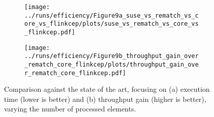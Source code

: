 \begin{figure}[t]
	\begin{subfigure}{.38\linewidth}
		\centering
		\texttt{[image: ../runs/efficiency/Figure9a\_suse\_vs\_rematch\_vs\_core\_vs\_flinkcep/plots/suse\_vs\_rematch\_vs\_core\_vs\_flinkcep.pdf]}
		\vspace{-18pt}
		\caption{}
		\label{plot:suse-vs-rematch-exec-time}
	\end{subfigure}
    \hfill
	\begin{subfigure}{.38\linewidth}
		\centering
		\texttt{[image: ../runs/efficiency/Figure9b\_throughput\_gain\_over\_rematch\_core\_flinkcep/plots/throughput\_gain\_over\_rematch\_core\_flinkcep.pdf]}
		\vspace{-18pt}
		\caption{}
		\label{plot:suse-vs-rematch-throughput-gain}
	\end{subfigure}
	\vspace{-1em}
    \hfill
    \caption{Comparison against the state of the art, focusing on (a)
    execution time (lower is better) and (b) throughput gain (higher is
    better), varying the number of processed elements.}
	\label{fig:suse_vs_rematch}
	\vspace{-1em}
\end{figure}

